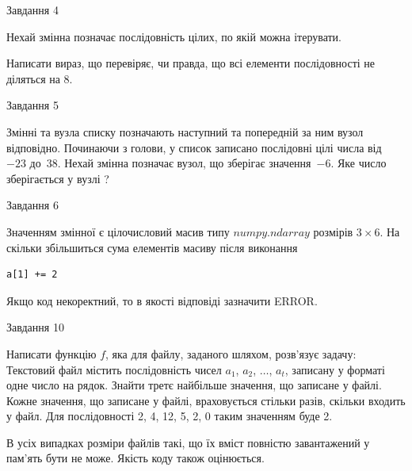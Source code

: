 \documentclass[12pt, ukrainian]{article}
\begin{document}
{               
{\begin{center}Завдання {4}\end{center}}
\vspace{-6mm}
Нехай змінна  позначає послідовність цілих, по якій можна ітерувати.

Написати вираз, що перевіряє, чи правда, що всі елементи послідовності не діляться на 8.\par

\vspace{10mm}
               
{\begin{center}Завдання {5}\end{center}}
\vspace{-6mm}
Змінні  та  вузла списку позначають наступний та попередній за ним вузол відповідно. Починаючи з голови, у список записано послідовні цілі числа від~$-23$ до~$38$. Нехай змінна  позначає вузол, що зберігає значення~$-6$.
Яке число зберігається у вузлі  ?\par

               
{\begin{center}Завдання {6}\end{center}}
\vspace{-6mm}
Значенням змінної  є цілочисловий масив типу $numpy.ndarray$ розмірів $3{\times}6$. На скільки збільшиться сума елементів масиву  після виконання
\begin{verbatim}
a[1] += 2
\end{verbatim}


Якщо код некоректний, то в якості відповіді зазначити ERROR.\par

               
{\begin{center}Завдання {10}\end{center}}
\vspace{-6mm}

Написати функцію $f$, яка для файлу, заданого шляхом, розв’язує задачу:\\ Текстовий файл містить послідовність чисел $a_1$, $a_2$, $\ldots$, $a_t$, записану у форматі одне число на рядок. Знайти третє найбільше значення, що записане у файлі. Кожне значення, що записане у файлі, враховується стільки разів, скільки входить у файл. Для послідовності 2, 4, 12, 5, 2, 0 таким значенням буде 2.

В усіх випадках розміри файлів такі, що їх вміст повністю завантажений у пам'ять бути не може. Якість коду також оцінюється.



}
\end{document}
